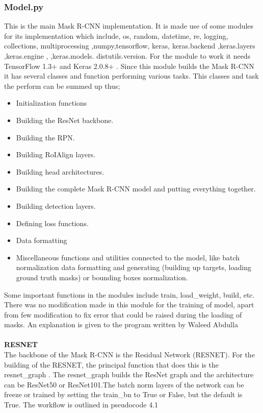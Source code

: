  \subsubsection{Model.py}
 This is the main Mask R-CNN implementation. It is made use of some modules for its implementation which include, os, random, datetime, re, logging, collections, multiprocessing ,numpy,tensorflow, keras, keras.backend ,keras.layers ,keras.engine , ,keras.models. distutils.version. For the module to work it needs TensorFlow 1.3+ and Keras 2.0.8+ .  Since this module builds the Mask R-CNN it has several classes and function performing various tasks. This classes and task the perform can be summed up thus;
 \begin{itemize}
   \item 	Initialization functions
   \item Building the ResNet backbone.
   \item Building the RPN.
   \item Building RoIAlign layers.
   \item Building head architectures.
   \item Building the complete Mask R-CNN model and putting everything together.
   \item Building detection layers.
   \item Defining loss functions.
   \item	Data formatting
   \item Miscellaneous functions and utilities connected to the model, like batch normalization data formatting and generating (building up targets, loading ground truth masks) or bounding boxes normalization.
   
 \end{itemize}
 Some important functions in the modules include train, load\_weight, build, etc. There was no modification made in this module for the training of model, apart from few modification to fix error that could be raised during the loading of masks. An explanation is given to the program written by Waleed Abdulla
\\ 
\\
\textbf{ RESNET}
\\
 The backbone of the Mask R-CNN is the Residual Network (RESNET). For the building of the RESNET, the principal function that does this is the resnet\_graph . The  resnet\_graph builds the ResNet graph and the  architecture can be ResNet50 or ResNet101.The batch norm layers of the network can be freeze or trained by setting the train\_bn to True or False, but the default is True. The workflow is outlined in pseudocode 4.1
 \\
\\

